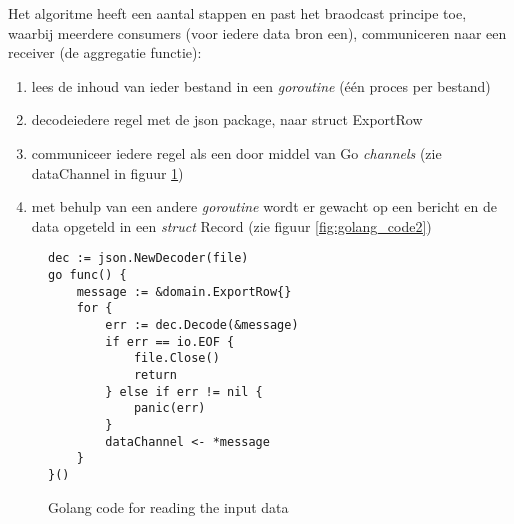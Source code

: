 \begin{comment}
het volgende algoritme is geïmplementeerd voor de data aggregatie:
Iedere regel die is uitgelezen uit een input bestand wordt gecommuniceerd in een goroutine.
Een ander goroutine leest leest dir 

een proces verwerkt het inlezen van data uit een bestand. Voor twee bestanden worden er twee concurrent processen gestart. 
Daarnaast is een een proces dat voor ieder bericht de functies uitvoert om iedere kolomn uit op te tellen aan het vorige resultaat.
het resultaat wordt opgeslagen in een mapping, waarbij iedere key één regel representeer in het eindresultaat. Iedere regel uit de data input met een overeenkomstige key, wordt opgezocht in de mapping, en alle alle waardes uit de kolommen worden opgeteld.

het volgende voorbeeld visualeerd de mapping:
\begin{verbatim}
{
 Key{TimeID: 19881231, ShopID: 117, ChannelID: 4}:  Result{Visits: 100, Orders: 6},
 Key{TimeID: 19881231, ShopID: 117, ChannelID: 110}: Result{Visits: 47, Orders: 6}
}
\end{verbatim}

De key bevat de volgende waarden:  en de waardes voor data zijn te omschrijven als

\end{comment}

Het algoritme heeft een aantal stappen en past het braodcast principe toe, waarbij meerdere consumers (voor iedere data bron een), communiceren naar een receiver (de aggregatie functie):


\begin{enumerate}
\item lees de inhoud van ieder bestand in een \textit{goroutine} (één proces per bestand)
\item decodeiedere regel met de json package, naar struct ExportRow{} 
\item communiceer iedere regel als een door middel van Go \textit{channels} (zie dataChannel in figuur \ref{fig:golang_code1})
\item met behulp van een andere \textit{goroutine} wordt er gewacht op een bericht en de data opgeteld in een \textit{struct} Record{} (zie figuur \ref{fig:golang_code2})
\end{enumerate}

\clearpage

\begin{figure}[h]
\caption{Golang code for reading the input data } \label{fig:golang_code1}
\begin{lstlisting}[language=Golang]
dec := json.NewDecoder(file)
go func() {
    message := &domain.ExportRow{}
    for {
        err := dec.Decode(&message)
        if err == io.EOF {
            file.Close()
            return
        } else if err != nil {
            panic(err)
        }
        dataChannel <- *message
    }
}()
\end{lstlisting}
\end{figure}


